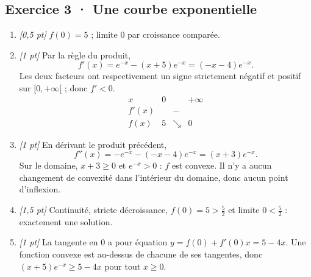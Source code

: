 \subsection*{Exercice 3 · Une courbe exponentielle}\begin{enumerate}

\item \textit{[0,5 pt]} $f(0)=5$ ; limite $0$ par croissance comparée.

\item \textit{[1 pt]} Par la règle du produit,
\[f'(x)=e^{-x}-(x+5)e^{-x}=(-x-4)e^{-x}.\]
Les deux facteurs ont respectivement un signe strictement négatif et positif sur $[0,+\infty[$ ; donc $f'<0$.
\[\begin{array}{c|ccc}x&0&&+\infty\\\hline f'(x)&&-&\\\hline f(x)&5&\searrow&0\end{array}\]

\item \textit{[1 pt]} En dérivant le produit précédent,
\[f''(x)=-e^{-x}-(-x-4)e^{-x}=(x+3)e^{-x}.\]
Sur le domaine, $x+3\ge0$ et $e^{-x}>0$ : $f$ est convexe. Il n'y a aucun changement de convexité dans l'intérieur du domaine, donc aucun point d'inflexion.

\item \textit{[1,5 pt]} Continuité, stricte décroissance, $f(0)=5>\frac{5}{2}$ et limite $0<\frac{5}{2}$ : exactement une solution.

\item \textit{[1 pt]} La tangente en $0$ a pour équation $y=f(0)+f'(0)x=5-4x$. Une fonction convexe est au-dessus de chacune de ses tangentes, donc $(x+5)e^{-x}\ge 5-4x$ pour tout $x\ge0$.

\end{enumerate}

